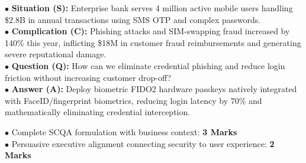 \begin{solutionbox}
$\bullet$ \textbf{Situation (S):} Enterprise bank serves 4 million active mobile users handling \$2.8B in annual transactions using SMS OTP and complex passwords.\\
$\bullet$ \textbf{Complication (C):} Phishing attacks and SIM-swapping fraud increased by 140\% this year, inflicting \$18M in customer fraud reimbursements and generating severe reputational damage.\\
$\bullet$ \textbf{Question (Q):} How can we eliminate credential phishing and reduce login friction without increasing customer drop-off?\\
$\bullet$ \textbf{Answer (A):} Deploy biometric FIDO2 hardware passkeys natively integrated with FaceID/fingerprint biometrics, reducing login latency by 70\% and mathematically eliminating credential interception.
\begin{markingrubric}
$\bullet$ Complete SCQA formulation with business context: \textbf{3 Marks}\\
$\bullet$ Persuasive executive alignment connecting security to user experience: \textbf{2 Marks}
\end{markingrubric}
\end{solutionbox}

